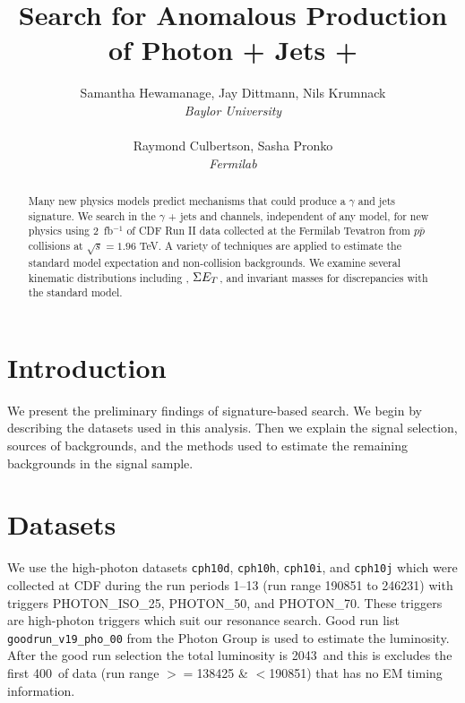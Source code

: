 \documentclass[11pt]{article}
\begin{document}
\title{Search for Anomalous Production of Photon + Jets + \met}
\author{Samantha Hewamanage, Jay Dittmann, Nils Krumnack\\
    {\it Baylor University} \\
    \\
Raymond Culbertson, Sasha Pronko \\
    {\it Fermilab} \\
}

\def\newpage{\par\penalty 100}          %
\maketitle
\def\newpage{\par\vfill\penalty -10000} %

\vspace*{-0.1truein}
\def\newpage{\par\penalty 100}          %

\begin{abstract}
\noindent 
Many new physics models predict mechanisms that could produce a $\gamma$ and jets signature.  We search in the $\gamma$ + jets and \phojetsmet channels, independent of any model, for new physics using 2~fb$^{-1}$  of CDF Run II data collected at the Fermilab Tevatron from $p\bar{p}$ collisions at $\sqrt{s} = 1.96$ TeV. A variety of techniques are applied to estimate the standard model expectation and non-collision backgrounds. We examine several kinematic distributions including \met, $\Sigma \mbox{$E_T$}$, and invariant masses for discrepancies with the standard model. 
\end{abstract}

\pagestyle{plain}


\section{Introduction}
We present the preliminary findings of  \phojetsmet signature-based search. We begin by describing the datasets used in this analysis. Then we explain the signal selection, sources of backgrounds, and the methods used to estimate the remaining backgrounds in the signal sample. 

\section{Datasets}
We use the high-\pt photon datasets \texttt{cph10d}, \texttt{cph10h}, \texttt{cph10i}, and \texttt{cph10j} which were collected at CDF during the run periods 1--13 (run range 190851 to 246231) with triggers \mbox{PHOTON\_ISO\_25}, \mbox{PHOTON\_50}, and \mbox{PHOTON\_70}. These triggers are high-\pt photon triggers which suit our resonance search.  Good run list \texttt{goodrun\_v19\_pho\_00} from the Photon Group is used to estimate the luminosity.  After the good run selection the total luminosity is  2043~\pbi and this is excludes the first 400~\pbi of data (run range $>=$138425 \& $<$190851) that has no EM timing information.
\end{document}
